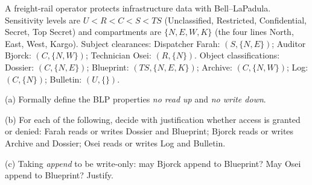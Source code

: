 \documentclass[12pt, a4paper]{article}
\begin{document}
\begin{problembox}
A freight-rail operator protects infrastructure data with Bell--LaPadula. Sensitivity levels are $U < R < C < S < TS$ (Unclassified, Restricted, Confidential, Secret, Top Secret) and compartments are $\{N, E, W, K\}$ (the four lines North, East, West, Kargo). Subject clearances: Dispatcher Farah: $(S, \{N, E\})$; Auditor Bjorck: $(C, \{N, W\})$; Technician Osei: $(R, \{N\})$. Object classifications: Dossier: $(C, \{N, E\})$; Blueprint: $(TS, \{N, E, K\})$; Archive: $(C, \{N, W\})$; Log: $(C, \{N\})$; Bulletin: $(U, \{\})$.

(a) Formally define the BLP properties \emph{no read up} and \emph{no write down}.

(b) For each of the following, decide with justification whether access is granted or denied: Farah reads or writes Dossier and Blueprint; Bjorck reads or writes Archive and Dossier; Osei reads or writes Log and Bulletin.

(c) Taking \emph{append} to be write-only: may Bjorck append to Blueprint? May Osei append to Blueprint? Justify.
\end{problembox}
\end{document}
